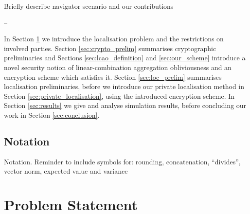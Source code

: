 \documentclass[twocolumn]{autart}
\begin{document}
Briefly describe navigator scenario and our contributions

--

In Section \ref{sec:problem_statement} we introduce the localisation problem and the restrictions on involved parties. Section \ref{sec:crypto_prelim} summarises cryptographic preliminaries and Sections \ref{sec:lcao_definition} and \ref{sec:our_scheme} introduce a novel security notion of linear-combination aggregation obliviousness and an encryption scheme which satisfies it. Section \ref{sec:loc_prelim} summarises localisation preliminaries, before we introduce our private localisation method in Section \ref{sec:private_localisation}, using the introduced encryption scheme. In Section \ref{sec:results} we give and analyse simulation results, before concluding our work in Section \ref{sec:conclusion}.

% 
% 

\subsection{Notation}
Notation. Reminder to include symbols for: rounding, concatenation, ``divides'', vector norm, expected value and variance


% 
%                                     
%                                     
%                                     
% 

\section{Problem Statement} \label{sec:problem_statement}
\end{document}
